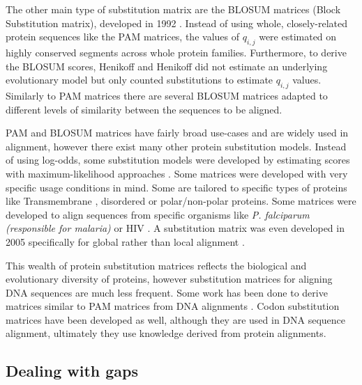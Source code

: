 \documentclass[
  11pt,
  twoside]{scrbook}
\begin{document}
The other main type of substitution matrix are the BLOSUM matrices (Block Substitution matrix), developed in 1992 \autocite{henikoffAminoAcidSubstitution1992}. Instead of using whole, closely-related protein sequences like the PAM matrices, the values of \(q_{i,j}\) were estimated on highly conserved segments across whole protein families. Furthermore, to derive the BLOSUM scores, Henikoff and Henikoff did not estimate an underlying evolutionary model but only counted substitutions to estimate \(q_{i,j}\) values. Similarly to PAM matrices there are several BLOSUM matrices adapted to different levels of similarity between the sequences to be aligned.

PAM and BLOSUM matrices have fairly broad use-cases and are widely used in alignment, however there exist many other protein substitution models. Instead of using log-odds, some substitution models were developed by estimating scores with maximum-likelihood approaches \autocite{whelanGeneralEmpiricalModel2001,leImprovedGeneralAmino2008}. Some matrices were developed with very specific usage conditions in mind. Some are tailored to specific types of proteins like Transmembrane \autocite{mullerNonsymmetricScoreMatrices2001,ngPHATTransmembranespecificSubstitution2000}, disordered \autocite{trivediAminoAcidSubstitution2019} or polar/non-polar \autocite{goonesekereContextspecificAminoAcid2008} proteins. Some matrices were developed to align sequences from specific organisms like \emph{P. falciparum} \autocite{pailaGenomeBiasInfluences2008} \emph{(responsible for malaria)} or HIV \autocite{nickleHIVSpecificProbabilisticModels2007}. A substitution matrix was even developed in 2005 specifically for global rather than local alignment \autocite{sardiuScoreStatisticsGlobal2005}.

This wealth of protein substitution matrices reflects the biological and evolutionary diversity of proteins, however substitution matrices for aligning DNA sequences are much less frequent. Some work has been done to derive matrices similar to PAM matrices from DNA alignments \autocite{chiaromonteScoringPairwiseGenomic2001}. Codon substitution matrices \autocite{schneiderEmpiricalCodonSubstitution2005,doron-faigenboimCombinedEmpiricalMechanistic2007} have been developed as well, although they are used in DNA sequence alignment, ultimately they use knowledge derived from protein alignments.

\hypertarget{dealing-with-gaps}{%
\subsection{Dealing with gaps}\label{dealing-with-gaps}}
\end{document}
